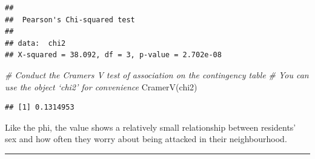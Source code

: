 \documentclass[
]{book}
\newenvironment{Shaded}{\begin{snugshade}}{\end{snugshade}}
\newcommand{\AttributeTok}[1]{\textcolor[rgb]{0.77,0.63,0.00}{#1}}
\newcommand{\CommentTok}[1]{\textcolor[rgb]{0.56,0.35,0.01}{\textit{#1}}}
\newcommand{\DecValTok}[1]{\textcolor[rgb]{0.00,0.00,0.81}{#1}}
\newcommand{\FunctionTok}[1]{\textcolor[rgb]{0.00,0.00,0.00}{#1}}
\newcommand{\NormalTok}[1]{#1}
\newcommand{\OtherTok}[1]{\textcolor[rgb]{0.56,0.35,0.01}{#1}}
\newcommand{\SpecialCharTok}[1]{\textcolor[rgb]{0.00,0.00,0.00}{#1}}
\newcommand{\StringTok}[1]{\textcolor[rgb]{0.31,0.60,0.02}{#1}}
\begin{document}
\begin{Shaded}
\end{Shaded}

\begin{verbatim}
## 
##  Pearson's Chi-squared test
## 
## data:  chi2
## X-squared = 38.092, df = 3, p-value = 2.702e-08
\end{verbatim}

\begin{Shaded}
\begin{Highlighting}[]
\CommentTok{\# Conduct the Cramer\textquotesingle{}s V test of association on the contingency table }
\CommentTok{\# You can use the object ‘chi2’ for convenience }
\FunctionTok{CramerV}\NormalTok{(chi2)}
\end{Highlighting}
\end{Shaded}

\begin{verbatim}
## [1] 0.1314953
\end{verbatim}

Like the phi, the value shows a relatively small relationship between residents' sex and how often they worry about being attacked in their neighbourhood.

\begin{center}\rule{0.5\linewidth}{0.5pt}\end{center}
\end{document}

